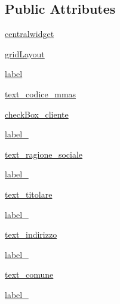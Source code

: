\subsection*{Public Attributes}
\begin{DoxyCompactItemize}
\item 
\hyperlink{classmmasgis_1_1Ui__anagrafica__modificato_1_1Ui__MainWindow_add3040a5510cb53a90424d7a9fbe860b}{centralwidget}
\item 
\hyperlink{classmmasgis_1_1Ui__anagrafica__modificato_1_1Ui__MainWindow_aaa363fad80b58bc73ba082efe9856b37}{gridLayout}
\item 
\hyperlink{classmmasgis_1_1Ui__anagrafica__modificato_1_1Ui__MainWindow_aaf91596cbf48956f65f3bee5ea01f65b}{label}
\item 
\hyperlink{classmmasgis_1_1Ui__anagrafica__modificato_1_1Ui__MainWindow_a51c9faae39c1a68976451be1232b6083}{text\_\-codice\_\-mmas}
\item 
\hyperlink{classmmasgis_1_1Ui__anagrafica__modificato_1_1Ui__MainWindow_ac21e9414e21c2d25af702dc4764b558e}{checkBox\_\-cliente}
\item 
\hyperlink{classmmasgis_1_1Ui__anagrafica__modificato_1_1Ui__MainWindow_a85c98bec15093f21c16bff7c25cef3ef}{label\_}
\item 
\hyperlink{classmmasgis_1_1Ui__anagrafica__modificato_1_1Ui__MainWindow_a9ecffc4da65ebfe47800ceeb3861c0c1}{text\_\-ragione\_\-sociale}
\item 
\hyperlink{classmmasgis_1_1Ui__anagrafica__modificato_1_1Ui__MainWindow_a5076c7fe815eba04b56da7e142617096}{label\_}
\item 
\hyperlink{classmmasgis_1_1Ui__anagrafica__modificato_1_1Ui__MainWindow_a8280022bc63fe7eb5bb65c6951420473}{text\_\-titolare}
\item 
\hyperlink{classmmasgis_1_1Ui__anagrafica__modificato_1_1Ui__MainWindow_a1292427c45cec4d5c445a7fe299044df}{label\_}
\item 
\hyperlink{classmmasgis_1_1Ui__anagrafica__modificato_1_1Ui__MainWindow_a6eacd91ebceeaea54d627924b01cc096}{text\_\-indirizzo}
\item 
\hyperlink{classmmasgis_1_1Ui__anagrafica__modificato_1_1Ui__MainWindow_ac326523b8f015208fd00defcaa956f2d}{label\_}
\item 
\hyperlink{classmmasgis_1_1Ui__anagrafica__modificato_1_1Ui__MainWindow_a6b77b22f9501737c94e3208b8caa58c8}{text\_\-comune}
\item 
\hyperlink{classmmasgis_1_1Ui__anagrafica__modificato_1_1Ui__MainWindow_aca53d9772f575427f2165aca3a52eb2a}{label\_}

\end{DoxyCompactItemize}
